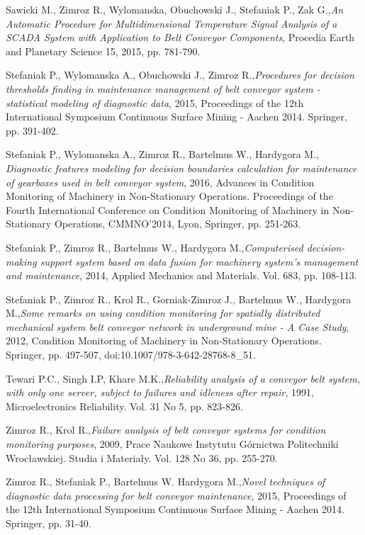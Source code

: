 \begin{thebibliography}{}
 Sawicki M., Zimroz R., Wylomanska, Obuchowski J., Stefaniak P., Zak G.,\emph{An Automatic Procedure for Multidimensional Temperature Signal Analysis of a SCADA System with Application to Belt Conveyor Components}, Procedia Earth and Planetary Science 15, 2015, pp. 781-790.

 Stefaniak P.,  Wylomanska A.,  Obuchowski J., Zimroz  R.,\emph{Procedures for decision thresholds finding in maintenance management of  belt conveyor  system - statistical modeling of diagnostic data}, 2015, Proceedings of the 12th International Symposium Continuous Surface Mining - Aachen 2014. Springer, pp. 391-402.

 Stefaniak P., Wylomanska A., Zimroz R., Bartelmus W., Hardygora M.,\emph{ Diagnostic features modeling for decision boundaries calculation for maintenance of gearboxes used in belt conveyor system}, 2016, Advances in Condition Monitoring of Machinery in Non-Stationary Operations. Proceedings of the Fourth International Conference on Condition Monitoring of Machinery in Non-Stationary Operations, CMMNO'2014, Lyon, Springer, pp. 251-263.

 Stefaniak P., Zimroz R., Bartelmus W., Hardygora M.,\emph{Computerised decision-making support system based on data fusion for machinery system's management and maintenance}, 2014, Applied Mechanics and Materials. Vol. 683, pp. 108-113.

 Stefaniak P., Zimroz R., Krol R., Gorniak-Zimroz J., Bartelmus W., Hardygora M.,\emph{Some remarks on using condition monitoring for spatially distributed mechanical system belt conveyor network in underground mine - A Case Study}, 2012, Condition Monitoring of Machinery in Non-Stationary Operations. Springer, pp. 497-507, doi:10.1007/978-3-642-28768-8\_51.

 Tewari P.C., Singh I.P, Khare M.K.,\emph{Reliability analysis of a conveyor belt system, with only one server, subject to failures and idleness after repair}, 1991, Microelectronics Reliability. Vol. 31 No 5, pp. 823-826.

 Zimroz R., Krol R.,\emph{Failure analysis of belt conveyor systems for condition monitoring purposes}, 2009, Prace Naukowe Instytutu G{\'o}rnictwa Politechniki Wroc{\l}awskiej. Studia i Materia{\l}y. Vol. 128 No 36, pp. 255-270.

 Zimroz R., Stefaniak P., Bartelmus W. Hardygora M.,\emph{Novel techniques of diagnostic data processing for belt conveyor maintenance}, 2015, Proceedings of the 12th International Symposium Continuous Surface Mining - Aachen 2014. Springer, pp. 31-40.




\end{thebibliography}


